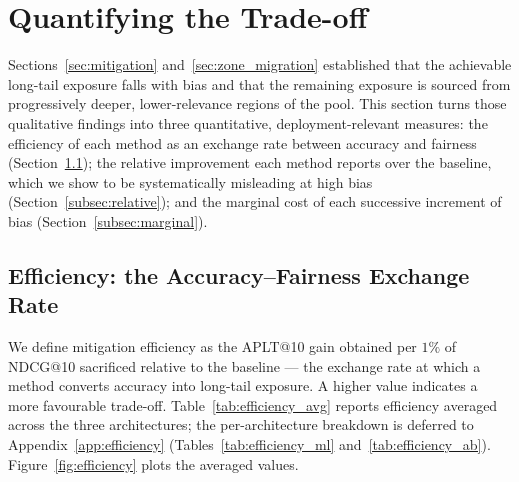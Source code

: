 %
%

\section{Quantifying the Trade-off}
\label{sec:tradeoff}

Sections~\ref{sec:mitigation} and~\ref{sec:zone_migration} established
that the achievable long-tail exposure falls with bias and that the
remaining exposure is sourced from progressively deeper, lower-relevance
regions of the pool. This section turns those qualitative findings into
three quantitative, deployment-relevant measures: the efficiency of each
method as an exchange rate between accuracy and fairness
(Section~\ref{subsec:efficiency}); the relative improvement each method
reports over the baseline, which we show to be systematically misleading
at high bias (Section~\ref{subsec:relative}); and the marginal cost of
each successive increment of bias (Section~\ref{subsec:marginal}).

\subsection{Efficiency: the Accuracy--Fairness Exchange Rate}
\label{subsec:efficiency}

We define mitigation efficiency as the APLT@10 gain obtained per
$1\%$ of NDCG@10 sacrificed relative to the baseline --- the exchange
rate at which a method converts accuracy into long-tail exposure. A
higher value indicates a more favourable trade-off.
Table~\ref{tab:efficiency_avg} reports efficiency averaged across the
three architectures; the per-architecture breakdown is deferred to
Appendix~\ref{app:efficiency} (Tables~\ref{tab:efficiency_ml}
and~\ref{tab:efficiency_ab}). Figure~\ref{fig:efficiency} plots the
averaged values.


